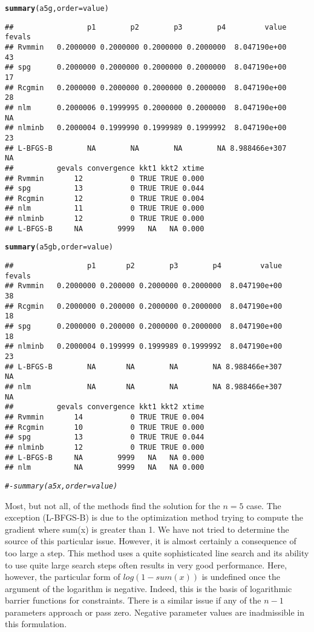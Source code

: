 \documentclass[11pt]{article}\usepackage[]{graphicx}\usepackage[]{color}
\makeatletter
\newcommand{\hlcom}[1]{\textcolor[rgb]{0.678,0.584,0.686}{\textit{#1}}}%
\newcommand{\hlstd}[1]{\textcolor[rgb]{0.345,0.345,0.345}{#1}}%
\newcommand{\hlkwc}[1]{\textcolor[rgb]{0.333,0.667,0.333}{#1}}%
\newcommand{\hlkwd}[1]{\textcolor[rgb]{0.737,0.353,0.396}{\textbf{#1}}}%
\newenvironment{kframe}{%
 \def\at@end@of@kframe{}%
 \ifinner\ifhmode%
  \def\at@end@of@kframe{\end{minipage}}%
  \begin{minipage}{\columnwidth}%
 \fi\fi%
 \def\FrameCommand##1{\hskip\@totalleftmargin \hskip-\fboxsep
 \colorbox{shadecolor}{##1}\hskip-\fboxsep
     \hskip-\linewidth \hskip-\@totalleftmargin \hskip\columnwidth}%
 \MakeFramed {\advance\hsize-\width
   \@totalleftmargin\z@ \linewidth\hsize
   \@setminipage}}%
 {\par\unskip\endMakeFramed%
 \at@end@of@kframe}
\newenvironment{knitrout}{}{} %
\makeatother
\begin{document}
\begin{knitrout}
\begin{kframe}
\begin{alltt}
\hlkwd{summary}\hlstd{(a5g,}\hlkwc{order}\hlstd{=value)}
\end{alltt}
\begin{verbatim}
##                 p1        p2        p3        p4         value fevals
## Rvmmin   0.2000000 0.2000000 0.2000000 0.2000000  8.047190e+00     43
## spg      0.2000000 0.2000000 0.2000000 0.2000000  8.047190e+00     17
## Rcgmin   0.2000000 0.2000000 0.2000000 0.2000000  8.047190e+00     28
## nlm      0.2000006 0.1999995 0.2000000 0.2000000  8.047190e+00     NA
## nlminb   0.2000004 0.1999990 0.1999989 0.1999992  8.047190e+00     23
## L-BFGS-B        NA        NA        NA        NA 8.988466e+307     NA
##          gevals convergence kkt1 kkt2 xtime
## Rvmmin       12           0 TRUE TRUE 0.000
## spg          13           0 TRUE TRUE 0.044
## Rcgmin       12           0 TRUE TRUE 0.004
## nlm          11           0 TRUE TRUE 0.000
## nlminb       12           0 TRUE TRUE 0.000
## L-BFGS-B     NA        9999   NA   NA 0.000
\end{verbatim}
\begin{alltt}
\hlkwd{summary}\hlstd{(a5gb,}\hlkwc{order}\hlstd{=value)}
\end{alltt}
\begin{verbatim}
##                 p1       p2        p3        p4         value fevals
## Rvmmin   0.2000000 0.200000 0.2000000 0.2000000  8.047190e+00     38
## Rcgmin   0.2000000 0.200000 0.2000000 0.2000000  8.047190e+00     18
## spg      0.2000000 0.200000 0.2000000 0.2000000  8.047190e+00     18
## nlminb   0.2000004 0.199999 0.1999989 0.1999992  8.047190e+00     23
## L-BFGS-B        NA       NA        NA        NA 8.988466e+307     NA
## nlm             NA       NA        NA        NA 8.988466e+307     NA
##          gevals convergence kkt1 kkt2 xtime
## Rvmmin       14           0 TRUE TRUE 0.004
## Rcgmin       10           0 TRUE TRUE 0.000
## spg          13           0 TRUE TRUE 0.044
## nlminb       12           0 TRUE TRUE 0.000
## L-BFGS-B     NA        9999   NA   NA 0.000
## nlm          NA        9999   NA   NA 0.000
\end{verbatim}
\begin{alltt}
\hlcom{#- summary(a5x,order=value)}
\end{alltt}
\end{kframe}
\end{knitrout}

Most, but not all, of the methods find the solution for the $n=5$ case. 
The exception (L-BFGS-B) is due to the optimization method trying to 
compute the gradient where sum(x) is greater than 1. We 
have not tried to determine the source of this particular issue. However, 
it is almost certainly 
a consequence of too large a step. This method uses a quite sophisticated
line search and its ability to use quite large search steps often results in
very good performance. Here, however, the particular form of $log(1-sum(x))$ 
is undefined once the argument of
the logarithm is negative. Indeed, this is the basis of 
logarithmic barrier functions for constraints. There
is a similar issue if any of the $n-1$ parameters approach or pass zero. Negative 
parameter values are inadmissible in this formulation. 
\end{document}
